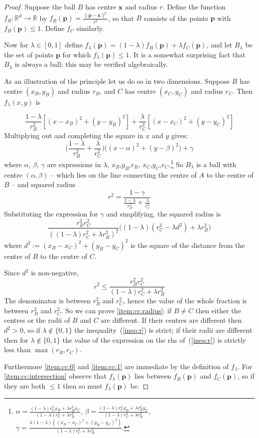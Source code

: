 \documentclass[a4paper]{article}
\newcommand\R{\mathbb{R}}
\begin{document}
\begin{proof}\citep{Welzl}
  \newcommand\x{\mathbf{x}}\newcommand\p{\mathbf{p}}
  Suppose the ball $B$ has centre $\x$ and radius $r$. Define the function $f_B: \R^d\to\R$ by $f_B(\p) = \frac{\|\p-\x\|^2}{r^2}$, so that $B$ consists of the points $\p$ with $f_B(\p)\leq1$. Define $f_C$ similarly.

  Now for $\lambda\in[0,1]$ define $f_\lambda(\p) = (1-\lambda)f_B(\p) + \lambda f_C(\p)$, and let $B_\lambda$ be the set of points $\p$ for which $f_\lambda(\p)\leq1$. It is a somewhat surprising fact that $B_\lambda$ is always a ball: this may be verified algebraically.

  As an illustration of the principle let us do so in two dimensions. Suppose $B$ has centre $(x_B,y_B)$ and radius $r_B$, and $C$ has centre $(x_C,y_C)$ and radius $r_C$. Then $f_\lambda(x,y)$ is

  \[ \frac{1-\lambda}{r_B^2}[(x-x_B)^2 + (y-y_B)^2] + \frac{\lambda}{r_C^2}[(x-x_C)^2 + (y-y_C)^2] \]
  Multiplying out and completing the square in $x$ and $y$ gives:
  \[ \bigl(\frac{1-\lambda}{r_B^2} + \frac{\lambda}{r_C^2}\bigr)\bigl((x-\alpha)^2 + (y-\beta)^2\bigr) + \gamma \]
  where $\alpha$, $\beta$, $\gamma$ are expressions in $\lambda$, $x_B$,$y_B$,$r_B$, $x_C$,$y_C$,$r_C$.\footnote{
    $\alpha = \frac{(1-\lambda) r_C^2 x_B + \lambda r_B^2 x_C}{(1-\lambda) r_C^2 + \lambda r_B^2}$,
    $\beta = \frac{(1-\lambda) r_C^2 y_B + \lambda r_B^2 y_C}{(1-\lambda) r_C^2 + \lambda r_B^2}$,
    $\gamma = \frac{\lambda(1-\lambda)((x_B-x_C)^2+(y_B-y_C)^2)}{(1-\lambda) r_C^2 + \lambda r_B^2}$.
  }
  So $B_\lambda$ is a ball with centre $(\alpha,\beta)$ -- which lies on the line connecting the centre of $A$ to the centre of $B$ -- and squared radius \[ r^2=\frac{1-\gamma}{\frac{1-\lambda}{r_B^2} + \frac{\lambda}{r_C^2}} \]
  Substituting the expression for $\gamma$ and simplifying, the squared radius is
  \[
    \frac{r_B^2r_C^2}{((1-\lambda) r_C^2 + \lambda r_B^2)^2}\bigl( (1-\lambda)(r_C^2-\lambda d^2) + \lambda r_B^2 \bigr)
  \]
  where $d^2:=(x_B-x_C)^2+(y_B-y_C)^2$ is the square of the distance from the centre of $B$ to the centre of $C$.

  Since $d^2$ is non-negative,
  \begin{equation}\label{ineq:r}
    r^2 \leq \frac{r_B^2r_C^2}{(1-\lambda) r_C^2 + \lambda r_B^2}
  \end{equation}
  The denominator is between $r_B^2$ and $r_C^2$, hence the value of the whole fraction is between $r_B^2$ and $r_C^2$. So we can prove \ref{item:cc:radius}: if $B\neq C$ then either the centres or the radii of $B$ and $C$ are different. If their centres are different then $d^2>0$, so if $\lambda\notin\{0,1\}$ the inequality~(\ref{ineq:r}) is strict; if their radii are different then for $\lambda\notin\{0,1\}$ the value of the expression on the rhs of~(\ref{ineq:r}) is strictly less than $\max(r_B,r_C)$.

  Furthermore \ref{item:cc:0} and \ref{item:cc:1} are immediate by the definition of $f_\lambda$. For \ref{item:cc:intersection} observe that $f_\lambda(\p)$ lies between $f_B(\p)$ and $f_C(\p)$, so if they are both $\leq1$ then so must $f_\lambda(\p)$ be.
\end{proof}
\end{document}
